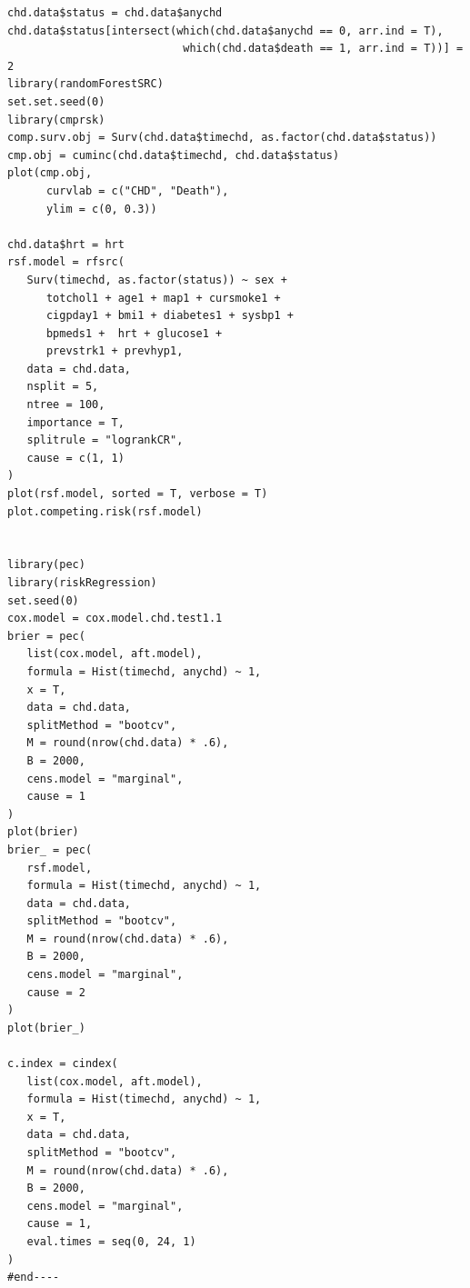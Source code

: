 \documentclass[lang=cn,11pt,a4paper,cite=super,AutoFakeBold]{elegantpaper}
\begin{document}
\begin{lstlisting}[style=R]
chd.data$status = chd.data$anychd
chd.data$status[intersect(which(chd.data$anychd == 0, arr.ind = T),
                           which(chd.data$death == 1, arr.ind = T))] = 2
library(randomForestSRC)
set.set.seed(0)
library(cmprsk)
comp.surv.obj = Surv(chd.data$timechd, as.factor(chd.data$status))
cmp.obj = cuminc(chd.data$timechd, chd.data$status)
plot(cmp.obj,
      curvlab = c("CHD", "Death"),
      ylim = c(0, 0.3))

chd.data$hrt = hrt
rsf.model = rfsrc(
   Surv(timechd, as.factor(status)) ~ sex +
      totchol1 + age1 + map1 + cursmoke1 +
      cigpday1 + bmi1 + diabetes1 + sysbp1 +
      bpmeds1 +  hrt + glucose1 +
      prevstrk1 + prevhyp1,
   data = chd.data,
   nsplit = 5,
   ntree = 100,
   importance = T,
   splitrule = "logrankCR",
   cause = c(1, 1)
)
plot(rsf.model, sorted = T, verbose = T)
plot.competing.risk(rsf.model)


library(pec)
library(riskRegression)
set.seed(0)
cox.model = cox.model.chd.test1.1
brier = pec(
   list(cox.model, aft.model),
   formula = Hist(timechd, anychd) ~ 1,
   x = T,
   data = chd.data,
   splitMethod = "bootcv",
   M = round(nrow(chd.data) * .6),
   B = 2000,
   cens.model = "marginal",
   cause = 1
)
plot(brier)
brier_ = pec(
   rsf.model,
   formula = Hist(timechd, anychd) ~ 1,
   data = chd.data,
   splitMethod = "bootcv",
   M = round(nrow(chd.data) * .6),
   B = 2000,
   cens.model = "marginal",
   cause = 2
)
plot(brier_)

c.index = cindex(
   list(cox.model, aft.model),
   formula = Hist(timechd, anychd) ~ 1,
   x = T,
   data = chd.data,
   splitMethod = "bootcv",
   M = round(nrow(chd.data) * .6),
   B = 2000,
   cens.model = "marginal",
   cause = 1,
   eval.times = seq(0, 24, 1)
)
#end----
\end{lstlisting}
\end{document}
